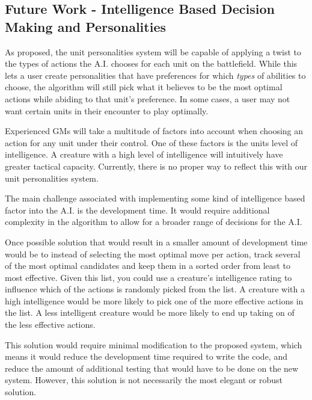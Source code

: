 \documentclass[12pt,a4paper]{report}
\begin{document}
		
		\subsection{Future Work - Intelligence Based Decision Making and Personalities}
		As proposed, the unit personalities system will be capable of applying a twist to the types of actions the A.I. chooses for each unit on the battlefield. While this lets a user create personalities that have preferences for which \textit{types} of abilities to choose, the algorithm will still pick what it believes to be the most optimal actions while abiding to that unit's preference. In some cases, a user may not want certain units in their encounter to play optimally. 
		
		Experienced GMs will take a multitude of factors into account when choosing an action for any unit under their control. One of these factors is the units level of intelligence. A creature with a high level of intelligence will intuitively have greater tactical capacity. Currently, there is no proper way to reflect this with our unit personalities system. 
		
		The main challenge associated with implementing some kind of intelligence based factor into the A.I. is the development time. It would require additional complexity in the algorithm to allow for a broader range of decisions for the A.I. 
		
		Once possible solution that would result in a smaller amount of development time would be to instead of selecting the most optimal move per action, track several of the most optimal candidates and keep them in a sorted order from least to most effective. Given this list, you could use a creature's intelligence rating to influence which of the actions is randomly picked from the list. A creature with a high intelligence would be more likely to pick one of the more effective actions in the list. A less intelligent creature would be more likely to end up taking on of the less effective actions.
		
		This solution would require minimal modification to the proposed system, which means it would reduce the development time required to write the code, and reduce the amount of additional testing that would have to be done on the new system. However, this solution is not necessarily the most elegant or robust solution. 
		
\end{document}
